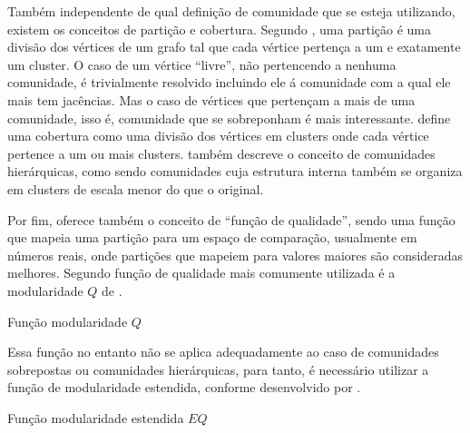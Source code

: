 \documentclass[notes.tex]{subfiles}
\begin{document}
Também independente de qual definição de comunidade que se esteja utilizando, existem os conceitos de partição e cobertura.
Segundo , uma partição é uma divisão dos vértices de um grafo tal que cada vértice pertença a um e exatamente um cluster.
O caso de um vértice ``livre'', não pertencendo a nenhuma comunidade, é trivialmente resolvido incluindo ele á comunidade com a qual ele mais tem jacências.
Mas o caso de vértices que pertençam a mais de uma comunidade, isso é, comunidade que se sobreponham é mais interessante.
 define uma cobertura como uma divisão dos vértices em clusters onde cada vértice pertence a um ou mais clusters.
 também descreve o conceito de comunidades hierárquicas, como sendo comunidades cuja estrutura interna também se organiza em clusters de escala menor do que o original.

Por fim,  oferece também o conceito de ``função de qualidade'', sendo uma função que mapeia uma partição para um espaço de comparação, usualmente em números reais, onde partições que mapeiem para valores maiores são consideradas melhores.
Segundo  função de qualidade mais comumente utilizada é a modularidade $Q$ de .

\begin{quadro}[htb]
\caption{\label{qua:exmp}Função modularidade $Q$}

    \begin{equasion}
    \end{equasion}

\end{quadro}

Essa função no entanto não se aplica adequadamente ao caso de comunidades sobrepostas ou comunidades hierárquicas, para tanto, é necessário utilizar a função de modularidade estendida, conforme desenvolvido por .

\begin{quadro}[htb]
\caption{\label{qua:exmp}Função modularidade estendida $EQ$}

    \begin{equasion}
    \end{equasion}

\end{quadro}
\end{document}
